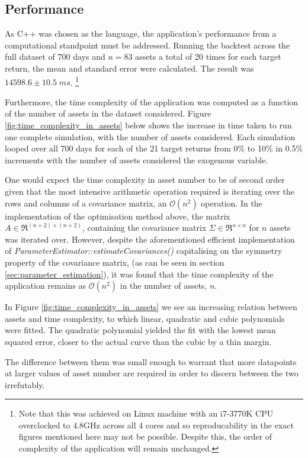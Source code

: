 \documentclass{article}
\begin{document}
\subsection{Performance}

As C++ was chosen as the language, the application's performance from a computational standpoint must be addressed. Running the backtest across the full dataset of 700 days and $n=83$ assets a total of 20 times for each target return, the mean and standard error were calculated. The result was $14598.6 \pm 10.5\;ms$. \footnote{Note that this was achieved on Linux machine with an i7-3770K CPU overclocked to 4.8GHz across all 4 cores and so reproducability in the exact figures mentioned here may not be possible. Despite this, the order of complexity of the application will remain unchanged.}

Furthermore, the time complexity of the application was computed as a function of the number of assets in the dataset considered. Figure \ref{fig:time_complexity_in_assets} below shows the increase in time taken to run one complete simulation, with the number of assets considered. Each simulation looped over all 700 days for each of the 21 target returns from 0\% to 10\% in 0.5\% increments with the number of assets considered the exogenous variable.

One would expect the time complexity in asset number to be of second order given that the most intensive arithmetic operation required is iterating over the rows and columns of a covariance matrix, an $\mathcal{O}(n^2)$ operation. In the implementation of the optimisation method above, the matrix $A \in \Re^{(n+2) \times (n+2)}$, containing the covariance matrix $\Sigma \in \Re^{n \times n} $ for $n$ assets was iterated over. However, despite the aforementioned efficient implementation of \textit{ParameterEstimator::estimateCovariances()} capitalising on the symmetry property of the covariance matrix, (as can be seen in section \ref{sec:parameter_estimation}), it was found that the time complexity of the application remains as $\mathcal{O}(n^2)$ in the number of assets, $n$.


In Figure \ref{fig:time_complexity_in_assets} we see an increasing relation between assets and time complexity, to which linear, quadratic and cubic polynomials were fitted. The quadratic polynomial yielded the fit with the lowest mean squared error, closer to the actual curve than the cubic by a thin margin.

The difference between them was small enough to warrant that more datapoints at larger values of asset number are required in order to discern between the two irrefutably.
\end{document}
